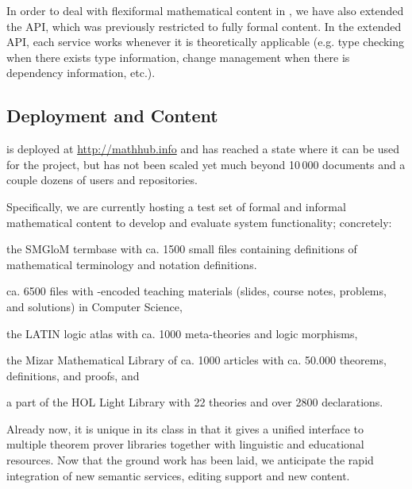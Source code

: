 In order to deal with flexiformal mathematical content in \omdoc, we have also extended
the \mmt API, which was previously restricted to fully formal content. In the extended
\mmt API, each \mmt service works whenever it is theoretically applicable (e.g. type
checking when there exists type information, change management when there is dependency
information, etc.).

\subsection{Deployment and Content}

\sys is deployed at \url{http://mathhub.info} and has reached a state where it can be
used for the \pn project, but has not been scaled yet much beyond 10\,000 documents and a
couple dozens of users and repositories.

Specifically, we are currently hosting a test set of formal and informal mathematical
content to develop and evaluate system functionality; concretely:
\begin{compactenum}[\em i\rm)]
\item the SMGloM termbase with ca. 1500 small \sTeX files containing definitions of
  mathematical terminology and notation definitions.
\item ca. 6500 files with \sTeX-encoded teaching materials (slides, course notes,
  problems, and solutions) in Computer Science,
\item the LATIN logic atlas with ca. 1000 meta-theories and logic morphisms,
\item the Mizar Mathematical Library of ca. 1000 articles with ca. 50.000 theorems,
  definitions, and proofs, and
\item a part of the HOL Light Library with 22 theories and over 2800 declarations.
\end{compactenum}
Already now, it is unique in its class in that it gives a unified interface to multiple
theorem prover libraries together with linguistic and educational resources. Now that the
ground work has been laid, we anticipate the rapid integration of new semantic services,
editing support and new content.




